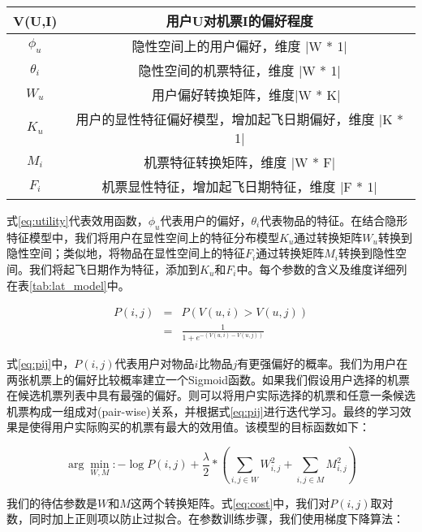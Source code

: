\begin{table}[!hpb]
  \centering
  \begin{tabular}{|c|c|} \hline 
V(U,I) & 用户U对机票I的偏好程度 \\ \hline
$\phi_u$ & 隐性空间上的用户偏好，维度 |W * 1| \\ \hline
$\theta_i$ & 隐性空间的机票特征，维度 |W * 1| \\ \hline
$W_u$ &　用户偏好转换矩阵，维度|W * K| \\ \hline
$K_u$ & 用户的显性特征偏好模型，增加起飞日期偏好，维度 |K * 1| \\ \hline
$M_i$ & 机票特征转换矩阵，维度 |W * F| \\ \hline
$F_i$ & 机票显性特征，增加起飞日期特征，维度 |F * 1| \\ \hline
  \end{tabular}
\end{table}

式\ref{eq:utility}代表效用函数，$\phi_u$代表用户的偏好，$\theta_i$代表物品的特征。在结合隐形特征模型中，我们将用户在显性空间上的特征分布模型$K_u$通过转换矩阵$W_u$转换到隐性空间；类似地，将物品在显性空间上的特征$F_i$通过转换矩阵$M_i$转换到隐性空间。我们将起飞日期作为特征，添加到$K_u$和$F_i$中。每个参数的含义及维度详细列在表\ref{tab:lat_model}中。

\begin{eqnarray}
\label{eq:pij}
    P(i,j) & = & P(V(u,i) > V(u,j)) \nonumber \\
	 & = &\frac{1}{1+e^{-(V(u,i) - V(u,j))}}
\end{eqnarray}

式\ref{eq:pij}中，$P(i,j)$代表用户对物品$i$比物品$j$有更强偏好的概率。我们为用户在两张机票上的偏好比较概率建立一个Sigmoid函数\parencite{jingfan1997novel}。如果我们假设用户选择的机票在候选机票列表中具有最强的偏好。则可以将用户实际选择的机票和任意一条候选机票构成一组成对(pair-wise)关系，并根据式\ref{eq:pij}进行迭代学习。最终的学习效果是使得用户实际购买的机票有最大的效用值。该模型的目标函数如下：

\begin{equation}
\label{eq:cost}
  \arg\min_{W,M} : - \log P(i,j) + \frac{\lambda}{2} * (\sum_{i,j \in W}W_{i,j}^2 + \sum_{i,j \in M}M_{i,j}^2)
\end{equation}

我们的待估参数是$W$和$M$这两个转换矩阵。式\ref{eq:cost}中，我们对$P(i,j)$取对数，同时加上正则项以防止过拟合。在参数训练步骤，我们使用梯度下降算法：

